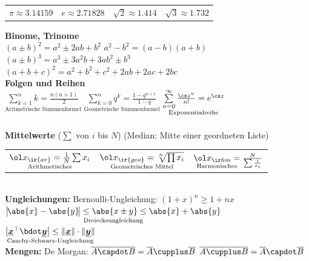 \documentclass[english]{latex4ei/latex4ei_sheet}
\renewcommand{\vec}[1]{\underline{\boldsymbol{#1}}}
\begin{document}
\begin{sectionbox}
	\begin{tabular}{@{}llll}
		$\pi \approx \num{3,14159}$ & $e \approx \num{2,71828}$ & $\sqrt{2} \approx \num{1,414}$ & $\sqrt{3} \approx \num{1,732}$ \\
	\end{tabular}

	\textbf{Binome, Trinome}\\
	$(a\pm b)^2 = a^2 \pm 2ab + b^2$ \hfill $a^2 - b^2 = (a-b)(a+b)$\\
	$(a \pm b)^3 = a^3 \pm 3a^2b + 3ab^2 \pm b^3$\\
	$(a+b+c)^2 = a^2 + b^2 + c^2 + 2ab + 2ac + 2bc$
	\\[0.5em]
	\textbf{Folgen und Reihen}\\
	$\underset{\text{Aritmetrische Summenformel}}{\sum \limits_{k=1}^{n} k = \frac{n (n+1)}{2}}$ \quad $\underset{\text{Geometrische Summenformel}}{\sum \limits_{k=0}^{n} q^k = \frac{1 - q^{n+1}}{1-q}}$ \quad $\underset{\text{Exponentialreihe}}{\sum\limits_{n = 0}^{\infty} \frac{\cx z^n}{n!} = e^{\cx z}}$\\
	\\[0.5em]
	\textbf{Mittelwerte} \quad ($\sum$ von $i$ bis $N$) \hfill {\small (Median: Mitte einer geordneten Liste)}\\
	\begin{tabular*}{\columnwidth}{@{\extracolsep\fill}l@{\quad\ $\ge$}l@{\quad\ $\ge$}l} 
	$\underset{\text{Arithmetisches}}{\ol x_{\ir{ar}} = \frac{1}{N} \sum x_i}$ & $\underset{\text{Geometrisches Mittel}}{\ol x_{\ir{geo}} = \sqrt[N]{ \prod x_i }}$ & $\underset{\text{Harmonisches}}{\ol x_{\ir hm} = }\frac{N}{\sum \frac{1}{x_i}}$\\ 
	\end{tabular*}
	\\[0.5em]
	\textbf{Ungleichungen:} \hfill Bernoulli-Ungleichung:  $(1+x)^n \ge 1+nx$\\
	$\underset{\text{Dreiecksungleichung}}{\big|\! \abs{x}- \abs{y}\!\big| \le \abs{x \pm y} \le \abs{x} + \abs{y}}$ \hfill
	$\underset{\text{Cauchy-Schwarz-Ungleichung}}{\left| \vec x^\top \bdot \vec y \right| \le \| \vec x\| \cdot \| \vec y\|}$
	\\[0.5em]
	\textbf{Mengen:} De Morgan: $\overline{A \capdot B} = \overline{A} \cupplus \overline{B}$ \hfill $\overline{A \cupplus B} = \overline{A} \capdot \overline{B}$
\end{sectionbox}
\end{document}
